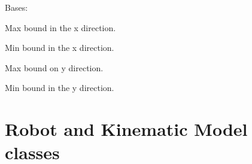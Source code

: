 \documentclass[letterpaper,10pt,english]{sphinxmanual}
\begin{document}
\begin{fulllineitems}
\label{Multi-robot motion planner:planning_sim.Boundary}
Bases: \href{http://docs.python.org/library/functions.html\#object}{}

\begin{fulllineitems}
\label{Multi-robot motion planner:planning_sim.Boundary.x_max}
Max bound in the x direction.

\end{fulllineitems}


\begin{fulllineitems}
\label{Multi-robot motion planner:planning_sim.Boundary.x_min}
Min bound in the x direction.

\end{fulllineitems}


\begin{fulllineitems}
\label{Multi-robot motion planner:planning_sim.Boundary.y_max}
Max bound on y direction.

\end{fulllineitems}


\begin{fulllineitems}
\label{Multi-robot motion planner:planning_sim.Boundary.y_min}
Min bound in the y direction.

\end{fulllineitems}


\end{fulllineitems}



\section{Robot and Kinematic Model classes}
\label{Multi-robot motion planner:robot-and-kinematic-model-classes}
\begin{DUlineblock}{0em}
\item[] 
\end{DUlineblock}
\end{document}
